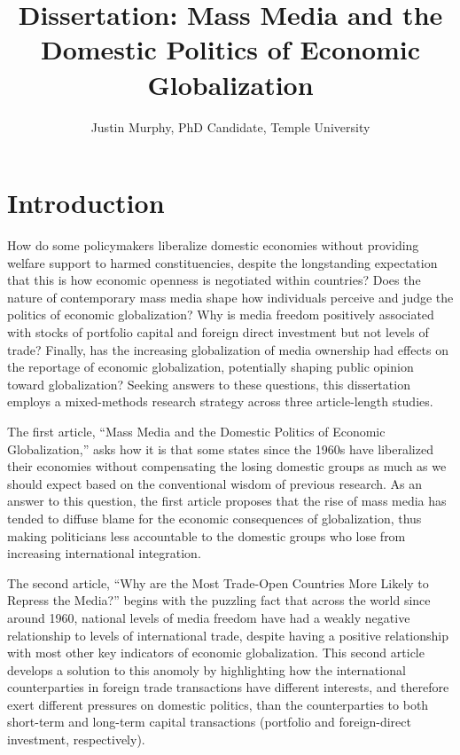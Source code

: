 \documentclass[12pt]{report}
\begin{document}
\title{Dissertation: Mass Media and the Domestic Politics of Economic Globalization}
\author{Justin Murphy, PhD Candidate, Temple University}

\maketitle

\tableofcontents

\doublespacing

\chapter{Introduction}

How do some policymakers liberalize domestic economies without providing welfare support to harmed constituencies, despite the longstanding expectation that this is how economic openness is negotiated within countries? Does the nature of contemporary mass media shape how individuals perceive and judge the politics of economic globalization?  Why is media freedom positively associated with stocks of portfolio capital and foreign direct investment but not levels of trade? Finally, has the increasing globalization of media ownership had effects on the reportage of economic globalization, potentially shaping public opinion toward globalization? Seeking answers to these questions, this dissertation employs a mixed-methods research strategy across three article-length studies.

The first article, ``Mass Media and the Domestic Politics of Economic Globalization,'' asks how it is that some states since the 1960s have liberalized their economies without compensating the losing domestic groups as much as we should expect based on the conventional wisdom of previous research. As an answer to this question, the first article proposes that the rise of mass media has tended to diffuse blame for the economic consequences of globalization, thus making politicians less accountable to the domestic groups who lose from increasing international integration.

The second article, ``Why are the Most Trade-Open Countries More Likely to Repress the Media?'' begins with the puzzling fact that across the world since around 1960, national levels of media freedom have had a weakly negative relationship to levels of international trade, despite having a positive relationship with most other key indicators of economic globalization. This second article develops a solution to this anomoly by highlighting how the international counterparties in foreign trade transactions have different interests, and therefore exert different pressures on domestic politics, than the counterparties to both short-term and long-term capital transactions (portfolio and foreign-direct investment, respectively).
\end{document}
